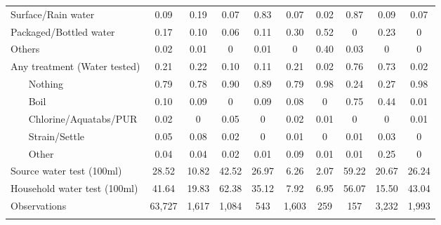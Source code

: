 \begin{table}[htbp]
\begin{tabular}{l*{9}{c}}
Surface/Rain water  &        0.09&        0.19&        0.07&        0.83&        0.07&        0.02&        0.87&        0.09&        0.07\\
Packaged/Bottled water&        0.17&        0.10&        0.06&        0.11&        0.30&        0.52&        0&        0.23&        0\\
Others              &        0.02&        0.01&        0&        0.01&        0&        0.40&        0.03&        0&        0\\
Any treatment (Water tested)&        0.21&        0.22&        0.10&        0.11&        0.21&        0.02&        0.76&        0.73&        0.02\\
~~~ Nothing      &        0.79&        0.78&        0.90&        0.89&        0.79&        0.98&        0.24&        0.27&        0.98\\
~~~ Boil         &        0.10&        0.09&        0&        0.09&        0.08&        0&        0.75&        0.44&        0.01\\
~~~ Chlorine/Aquatabs/PUR&        0.02&        0&        0.05&        0&        0.02&        0.01&        0&        0&        0.01\\
~~~ Strain/Settle&        0.05&        0.08&        0.02&        0&        0.01&        0&        0.01&        0.03&        0\\
~~~ Other        &        0.04&        0.04&        0.02&        0.01&        0.09&        0.01&        0.01&        0.25&        0\\
Source water test (100ml)&       28.52&       10.82&       42.52&       26.97&        6.26&        2.07&       59.22&       20.67&       26.24\\
Household water test (100ml)&       41.64&       19.83&       62.38&       35.12&        7.92&        6.95&       56.07&       15.50&       43.04\\
\hline
Observations        &      63,727&       1,617&       1,084&         543&       1,603&         259&         157&       3,232&       1,993\\
\hline\hline
\multicolumn{10}{p{0.87\linewidth}}{\footnotesize }\\
\end{tabular}
\end{table}
